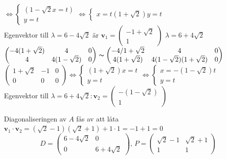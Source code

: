 \begin{enumerate}
        $\Leftrightarrow\begin{cases}
            (1-\sqrt{2}x=t)\\
            y=t
        \end{cases}
        \Leftrightarrow
        \begin{cases}
            x=t(1+\sqrt{2})
            y=t
        \end{cases}$\\
        Egenvektor till $\lambda=6-4\sqrt{2}$ är $\bm{v}_1=\begin{pmatrix}-1+\sqrt{2}\\1\end{pmatrix}$
        \underline{$\lambda=6+4\sqrt{2}$}\\
        $\begin{pmatrix}
            -4(1+\sqrt{2})&4&0\\
            4&4(1-\sqrt{2})&0
        \end{pmatrix}
        \thicksim
        \begin{pmatrix}
            -4/1+\sqrt{2}&4&0\\
            4(1+\sqrt{2})&4(1-\sqrt{2})(1+\sqrt{2})&0
        \end{pmatrix}$\\
        $\begin{pmatrix}
            1+\sqrt{2}&-1&0\\
            0&0&0
        \end{pmatrix}
        \Leftrightarrow
        \begin{cases}
            (1+\sqrt{2})x=t\\
            y=t
        \end{cases}
        \Leftrightarrow
        \begin{cases}
            x=-(1-\sqrt{2})t\\
            y=t
        \end{cases}$\\
        Egenvektor till $\lambda=6+4\sqrt{2}: \bm{v}_2=\begin{pmatrix}-(1-\sqrt{2})\\1\end{pmatrix}$
\end{enumerate}
Diagonaliseringen av $A$ fås av att låta 
$\bm{v}_1\cdot\bm{v}_2=(\sqrt{2}-1)(\sqrt{2}+1)+1\cdot 1=-1+1=0$
\begin{equation*}
    D=\begin{pmatrix}
        6-4\sqrt{2}&0\\
        0&6+4\sqrt{2}
    \end{pmatrix}\text{, }
    P=\begin{pmatrix}
        \sqrt{2}-1&\sqrt{2}+1\\
        1&1
    \end{pmatrix}
\end{equation*}
\clearpage
